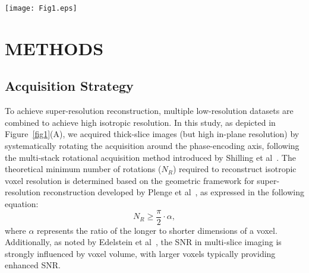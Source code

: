 \documentclass[AMA,STIX2COL]{MRM}
\begin{document}

\begin{figure*}[t]
\centerline{\texttt{[image: Fig1.eps]}}
\caption{Overview of the ROVER-MRI framework. \textbf{(A) Data Acquisition}: Eight low-resolution images are acquired with varying slice orientations to ensure comprehensive spatial coverage. \textbf{(B) SR Reconstruction}: A neural network-based implicit representation maps RAS spatial coordinates to pixel values, enabling high-quality super-resolution reconstruction. \textbf{(C) Coordinate Mapping}: Matrix coordinates from low-resolution images are preprocessed to extract precise image values for reconstruction. \textbf{(D) ROVER-MRI}: Multi-resolution hash encoding integrates spatial mapping, voxel hashing, feature retrieval, and auxiliary input concatenation to achieve enhanced reconstruction performance.}\label{fig1}
\end{figure*}

\section{METHODS}
\subsection{Acquisition Strategy}
To achieve super-resolution reconstruction, multiple low-resolution datasets are combined to achieve high isotropic resolution. In this study, as depicted in Figure~\ref{fig1}(A), we acquired thick-slice images (but high in-plane resolution) by systematically rotating the acquisition around the phase-encoding axis, following the multi-stack rotational acquisition method introduced by Shilling et al~\cite{shilling2008super}. The theoretical minimum number of rotations ($N_R$) required to reconstruct isotropic voxel resolution is determined based on the geometric framework for super-resolution reconstruction developed by Plenge et al~\cite{plenge2012super}, as expressed in the following equation:
%
\begin{equation}
\label{eq1}
N_R \geq \frac{\pi}{2} \cdot \alpha,
\end{equation}
%
where $\alpha$ represents the ratio of the longer to shorter dimensions of a voxel. Additionally, as noted by Edelstein et al~\cite{edelstein1986intrinsic}, the SNR in multi-slice imaging is strongly influenced by voxel volume, with larger voxels typically providing enhanced SNR.
\end{document}
